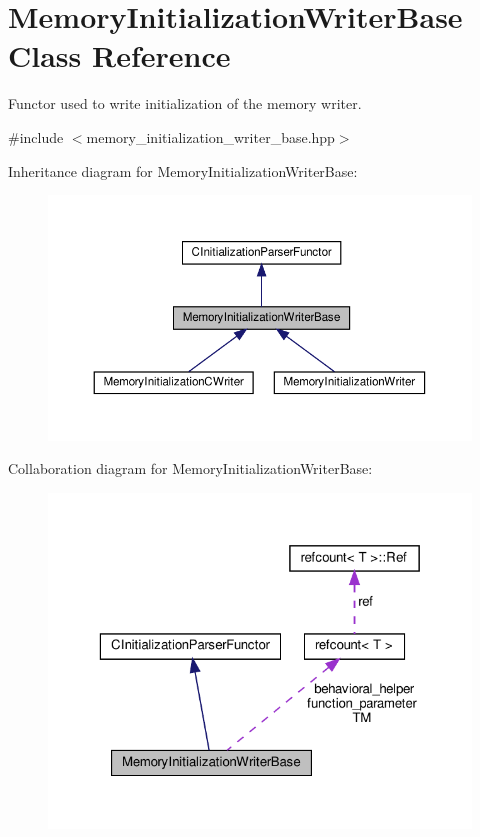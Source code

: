 \hypertarget{classMemoryInitializationWriterBase}{}\section{Memory\+Initialization\+Writer\+Base Class Reference}
\label{classMemoryInitializationWriterBase}


Functor used to write initialization of the memory writer.  




{\ttfamily \#include $<$memory\+\_\+initialization\+\_\+writer\+\_\+base.\+hpp$>$}



Inheritance diagram for Memory\+Initialization\+Writer\+Base\+:
\nopagebreak
\begin{figure}[H]
\begin{center}
\leavevmode
\includegraphics[width=350pt]{d8/d84/classMemoryInitializationWriterBase__inherit__graph}
\end{center}
\end{figure}


Collaboration diagram for Memory\+Initialization\+Writer\+Base\+:
\nopagebreak
\begin{figure}[H]
\begin{center}
\leavevmode
\includegraphics[width=323pt]{de/da2/classMemoryInitializationWriterBase__coll__graph}
\end{center}
\end{figure}
